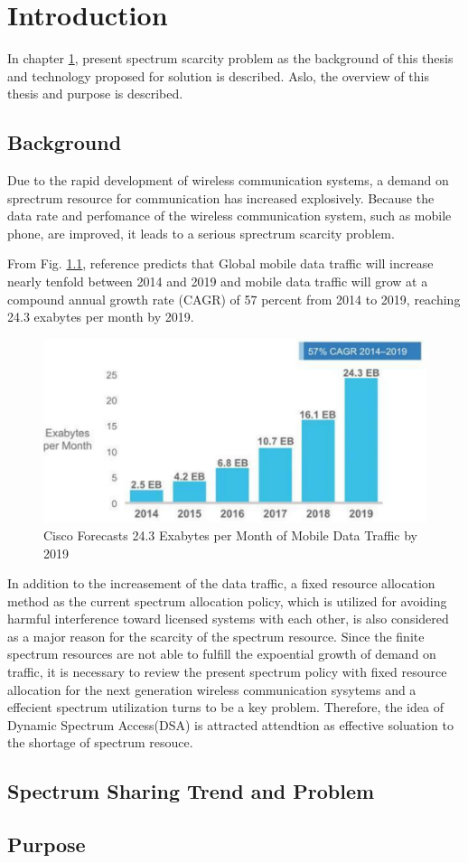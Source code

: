 \chapter[Introduction]{Introduction}
\label{chapter:introduction}

In chapter \ref{chapter:introduction},  present spectrum scarcity problem as the background of this thesis and technology proposed for solution is described. Aslo, the overview of this thesis and purpose is described. 
\section{Background}
 Due to the rapid development of wireless communication systems, a demand on sprectrum resource for communication has increased explosively. Because the data rate and perfomance of the wireless communication system, such as mobile phone, are improved, it leads to a serious sprectrum scarcity problem.

 From Fig. \ref{fig:Cisco}, reference \cite{ref:Cisco} predicts that Global mobile data traffic will increase nearly tenfold between 2014 and 2019 and mobile data traffic will grow at a compound annual growth rate (CAGR) of 57 percent from 2014 to 2019, reaching 24.3 exabytes per month by 2019. 
\begin{figure}[!htp]
\includegraphics[width=150mm,clip]{traffic_trend.pdf}
\caption{Cisco Forecasts 24.3 Exabytes per Month of Mobile Data Traffic by 2019}
\label{fig:Cisco}
\end{figure}
In addition to the increasement of the data traffic, a fixed resource allocation method as the current spectrum allocation policy, which is utilized for avoiding harmful interference toward licensed systems with each other, is also considered as a major reason for the scarcity of the spectrum resource.
Since the finite spectrum resources are not able to fulfill the expoential growth of demand on traffic, it is necessary to review the present spectrum policy with fixed resource allocation for the next generation wireless communication sysytems and a effecient spectrum utilization turns to be a key problem. 
Therefore, the idea of Dynamic Spectrum Access(DSA) is attracted attendtion as effective soluation to the shortage of spectrum resouce. 





\section{Spectrum Sharing Trend and Problem}

\section{Purpose}


